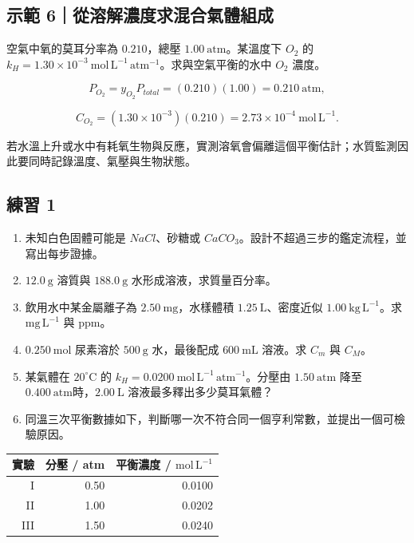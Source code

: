 \documentclass[11pt,a4paper]{article}
\newcounter{none}
\providecommand{\tightlist}{%
  \setlength{\itemsep}{0pt}\setlength{\parskip}{0pt}}
\begin{document}
\begin{HandoutWorkedExample}

\subsection{示範 6｜從溶解濃度求混合氣體組成}\label{ux793aux7bc4-6ux5f9eux6eb6ux89e3ux6fc3ux5ea6ux6c42ux6df7ux5408ux6c23ux9ad4ux7d44ux6210}

空氣中氧的莫耳分率為 \(0.210\)，總壓 \(1.00\ \mathrm{atm}\)。某溫度下 \(O_2\) 的 \(k_H=1.30\times10^{-3}\ \mathrm{mol\,L^{-1}\,atm^{-1}}\)。求與空氣平衡的水中 \(O_2\) 濃度。

\[
P_{O_2}=y_{O_2}P_{total}=(0.210)(1.00)=0.210\ \mathrm{atm},
\]

\[
C_{O_2}=(1.30\times10^{-3})(0.210)=2.73\times10^{-4}\ \mathrm{mol\,L^{-1}}.
\]

若水溫上升或水中有耗氧生物與反應，實測溶氧會偏離這個平衡估計；水質監測因此要同時記錄溫度、氣壓與生物狀態。

\end{HandoutWorkedExample}

\subsection{練習 1}\label{ux7df4ux7fd2-1}

\begin{enumerate}
\def\labelenumi{\arabic{enumi}.}
\tightlist
\item
  未知白色固體可能是 \(NaCl\)、砂糖或 \(CaCO_3\)。設計不超過三步的鑑定流程，並寫出每步證據。
\item
  \(12.0\ \mathrm g\) 溶質與 \(188.0\ \mathrm g\) 水形成溶液，求質量百分率。
\item
  飲用水中某金屬離子為 \(2.50\ \mathrm{mg}\)，水樣體積 \(1.25\ \mathrm L\)、密度近似 \(1.00\ \mathrm{kg\,L^{-1}}\)。求 \(\mathrm{mg\,L^{-1}}\) 與 ppm。
\item
  \(0.250\ \mathrm{mol}\) 尿素溶於 \(500\ \mathrm g\) 水，最後配成 \(600\ \mathrm{mL}\) 溶液。求 \(C_m\) 與 \(C_M\)。
\item
  某氣體在 \(20^\circ\mathrm C\) 的 \(k_H=0.0200\ \mathrm{mol\,L^{-1}\,atm^{-1}}\)。分壓由 \(1.50\ \mathrm{atm}\) 降至 \(0.400\ \mathrm{atm}\)時，\(2.00\ \mathrm L\) 溶液最多釋出多少莫耳氣體？
\item
  同溫三次平衡數據如下，判斷哪一次不符合同一個亨利常數，並提出一個可檢驗原因。
\end{enumerate}

{\def\LTcaptype{none} %
\begin{longtable}[]{@{}rrr@{}}
\toprule\noalign{}
實驗 & 分壓 / atm & 平衡濃度 / \(\mathrm{mol\,L^{-1}}\) \\
\midrule\noalign{}
\endhead
\bottomrule\noalign{}
\endlastfoot
I & 0.50 & 0.0100 \\
II & 1.00 & 0.0202 \\
III & 1.50 & 0.0240 \\
\end{longtable}
}
\end{document}
